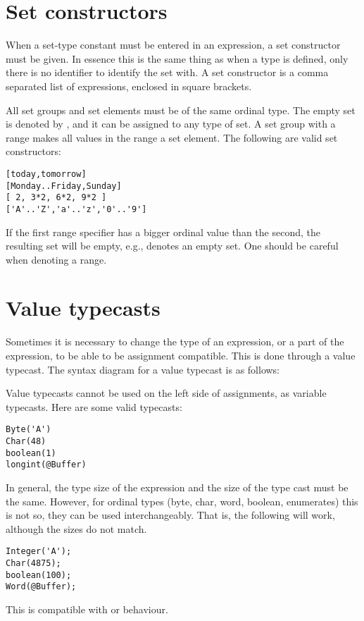 \section{Set constructors}
When a set-type constant must be entered in an expression, a
set constructor must be given. In essence this is the same thing as when a
type is defined, only there is no identifier to identify the set with.
A set constructor is a comma separated list of expressions, enclosed in
square brackets.

All set groups and set elements must be of the same ordinal type.
The empty set is denoted by \var{[]}, and it can be assigned to any type of
set. A set group with a range  \var{[A..Z]} makes all values in the range a
set element. 
The following are valid set constructors:
\begin{verbatim}
[today,tomorrow]
[Monday..Friday,Sunday]
[ 2, 3*2, 6*2, 9*2 ]
['A'..'Z','a'..'z','0'..'9']
\end{verbatim}
\begin{remark}
If the first range specifier has a bigger ordinal value than
the second, the resulting set will be empty, e.g., \var{['Z'..'A']} 
denotes an empty set. One should be careful when denoting a range.
\end{remark}

\section{Value typecasts}
Sometimes it is necessary to change the type of an expression, or a part of
the expression, to be able to be assignment compatible. This is done through
a value typecast. The syntax diagram for a value typecast is as follows:

Value typecasts cannot be used on the left side of assignments, as variable
typecasts.
Here are some valid typecasts:
\begin{verbatim}
Byte('A')
Char(48)
boolean(1)
longint(@Buffer)
\end{verbatim}
In general, the type size of the expression and the size of the type cast 
must be the same. However, for ordinal types (byte, char, word, boolean,
enumerates) this is not so, they can be used interchangeably. 
That is, the following will work, although the sizes do not match.
\begin{verbatim}
Integer('A');
Char(4875);
boolean(100);
Word(@Buffer);
\end{verbatim}
This is compatible with \delphi or \tp behaviour.


